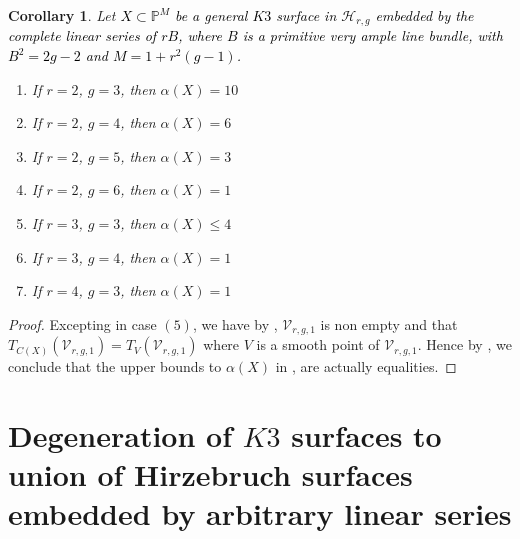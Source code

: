 \documentclass[11pt,twoside]{amsart}
\theoremstyle{plain}
\numberwithin{equation}{section}
\newtheorem{corollary}[theorem]{Corollary}
\theoremstyle{definition}
\begin{document}
\begin{corollary}\label{equality of alpha(x)}
Let \textcolor{black}{$X \subset \mathbb{P}^{M}$ be a general $K3$ surface in $\mathcal{H}_{r,g}$ embedded by the complete linear series of $rB$, where $B$ is a primitive very ample line bundle, with $B^2 = 2g-2$ and $M = 1+r^2(g-1)$.}

    \begin{enumerate}
        \item If $r = 2$, $g = 3$, then $\alpha(X) = 10$ %
        \item If $r = 2$, $g = 4$, then $\alpha(X) = 6$ 
        \item If $r = 2$, $g = 5$, then $\alpha(X) = 3$ 
        \item If $r = 2$, $g = 6$, then $\alpha(X) = 1$ 
        \item If $r = 3$, $g = 3$, then $\alpha(X) \leq 4$
        \item If $r = 3$, $g = 4$, then $\alpha(X) = 1$ 
        \item If $r = 4$, $g = 3$, then $\alpha(X) = 1$
\end{enumerate}
\end{corollary}

\begin{proof}
    Excepting in case $(5)$, we have by , $\mathcal{V}_{r,g,1}$ is non empty and that $T_{C(X)}(\mathcal{V}_{r,g,1}) = T_V(\mathcal{V}_{r,g,1})$ where $V$ is a smooth point of $\mathcal{V}_{r,g,1}$. Hence by , we conclude that the upper bounds to $\alpha(X)$ in , are actually equalities. 
\end{proof}

\section{Degeneration of $K3$ surfaces to union of Hirzebruch surfaces embedded by arbitrary linear series}
\end{document}
